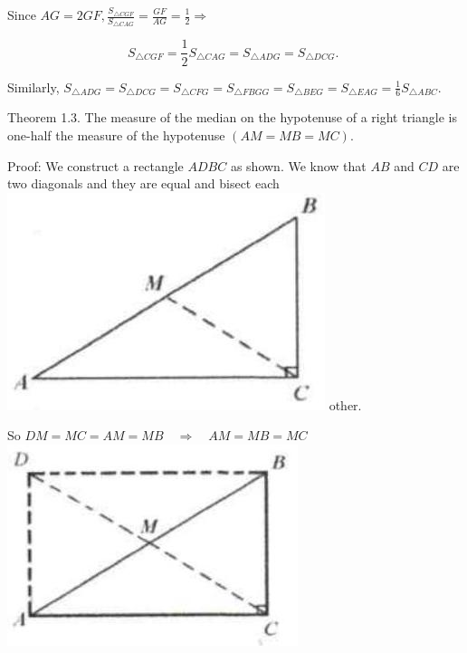 \documentclass[10pt]{article}
\begin{document}
Since \(A G=2 G F, \frac{S_{\triangle C G F}}{S_{\triangle C A G}}=\frac{G F}{A G}=\frac{1}{2} \Rightarrow\)

\[
S_{\triangle C G F}=\frac{1}{2} S_{\triangle C A G}=S_{\triangle A D G}=S_{\triangle D C G} \text {. }
\]

Similarly, \(S_{\triangle A D G}=S_{\triangle D C G}=S_{\triangle C F G}=S_{\triangle F B G G}=S_{\triangle B E G}=S_{\triangle E A G}=\frac{1}{6} S_{\triangle A B C}\).

Theorem 1.3. The measure of the median on the hypotenuse of a right triangle is one-half the measure of the hypotenuse \((A M=M B=M C)\).

Proof:
We construct a rectangle \(A D B C\) as shown. We know that \(A B\) and \(C D\) are two diagonals and they are equal and bisect each\\
\includegraphics[max width=\textwidth]{2025_04_17_97bc1f7e44d93c271a88g-008(2)} other.

So \(D M=M C=A M=M B \quad \Rightarrow \quad A M=M B=M C\)\\
\includegraphics[max width=\textwidth, center]{2025_04_17_97bc1f7e44d93c271a88g-008}
\end{document}

